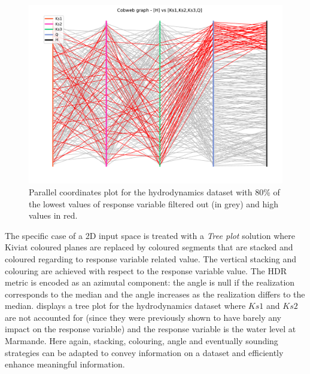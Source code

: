 \begin{figure}[!ht]
\centering
\includegraphics[width=\linewidth,keepaspectratio]{fig/contributions/visu/mascaret_cobweb.pdf}
\caption{Parallel coordinates plot for the hydrodynamics dataset with 80\% of the lowest values of response variable filtered out (in grey) and high values in red.}
\label{fig:cobweb-Kiviat}
\end{figure}

The specific case of a 2D input space is treated with a \emph{Tree plot} solution where Kiviat coloured planes are replaced by coloured segments that are stacked and coloured regarding to response variable related value. The vertical stacking and colouring are achieved with respect to the response variable value. The HDR metric is encoded as an azimutal component: the angle is null if the realization corresponds to the median and the angle increases as the realization differs to the median.  displays a tree plot for the hydrodynamics dataset where $Ks1$ and $Ks2$ are not accounted for (since they were previously shown to have barely any impact on the response variable) and the response variable is the water level at Marmande. Here again, stacking, colouring, angle and eventually sounding strategies can be adapted to convey information on a dataset and efficiently enhance meaningful information.


